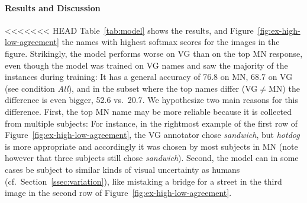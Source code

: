 \paragraph{Results and Discussion}
<<<<<<< HEAD
Table~\ref{tab:model} shows the results, and Figure~\ref{fig:ex-high-low-agreement} the names with highest softmax scores for the images in the figure.
Strikingly, the model performs worse on VG than on the top MN response, even though the model was trained on VG names and saw the majority of the instances during training: It has a general accuracy of 76.8 on MN, 68.7 on VG (see condition \textit{All}), and in the subset where the top names differ (VG$\neq$MN) the difference is even bigger, 52.6 vs.\ 20.7.
We hypothesize two main reasons for this difference.
First, the top MN name may be more reliable because it is collected from multiple subjects: For instance, in the rightmost example of the first row of Figure~\ref{fig:ex-high-low-agreement}, the VG annotator chose \textit{sandwich}, but \textit{hotdog} is more appropriate and accordingly it was chosen by most subjects in MN (note however that three subjects still chose \textit{sandwich}).
Second, the model can in some cases be subject to similar kinds of visual uncertainty as humans (cf.\ Section\ \ref{ssec:variation}), like mistaking a bridge for a street in the third image in the second row of Figure~\ref{fig:ex-high-low-agreement}.

